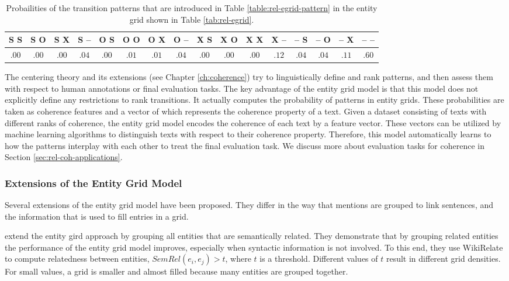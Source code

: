 \begin{table}
	\begin{center}
		\resizebox{\columnwidth}{!}
		{%
			\begin{tabular}{@{}cccccccccccccccc@{}}
				\toprule
				S S & S O & S X & S -- & O S & O O & O X & O -- & X S & X O & X X & X -- & -- S & -- O & -- X & -- -- \\
				\midrule
				$.00$ & $.00$ & $.00$ & $.04$ & $.00$ & $.01$ & $.01$ & $.04$ & $.00$ & $.00$ & $.00$ & $.12$ & $.04$ & $.04$ & $.11$ & $.60$ \\
				\bottomrule
			\end{tabular}
		}%
	\end{center}
	\caption{Probailities of the transition patterns that are introduced in Table \ref{table:rel-egrid-pattern} in the entity grid shown in Table \ref{tab:rel-egrid}.}
	\label{tab:rel-egrid-probs}
\end{table}

The centering theory and its extensions (see Chapter \ref{ch:coherence}) try to linguistically define and rank patterns, and then assess them with respect to human annotations or final evaluation tasks. 
The key advantage of the entity grid model is that this model does not explicitly define any restrictions to rank transitions. 
It actually computes the probability of patterns in entity grids. 
These probabilities are taken as coherence features and a vector of which represents the coherence property of a text. 
Given a dataset consisting of texts with different ranks of coherence, the entity grid model encodes the coherence of each text by a feature vector.  
These vectors can be utilized by machine learning algorithms to distinguish texts with respect to their coherence property. 
Therefore, this model automatically learns to how the patterns interplay with each other to treat the final evaluation task. 
We discuss more about evaluation tasks for coherence in Section \ref{sec:rel-coh-applications}.

\subsubsection{Extensions of the Entity Grid Model}
%
Several extensions of the entity grid model have been proposed. 
They differ in the way that mentions are grouped to link sentences, and the information that is used to fill entries in a grid. 

 extend the entity gird approach by grouping all entities that are semantically related.  
They demonstrate that by grouping related entities the performance of the entity grid model improves, especially when syntactic information is not involved. 
To this end, they use WikiRelate \cite{strube.aaai06} to compute relatedness between entities, $SemRel(e_i,e_j) >t$, where $t$ is a threshold.
Different values of $t$ result in different grid densities. 
For small values, a grid is smaller and almost filled because many entities are grouped together. 


